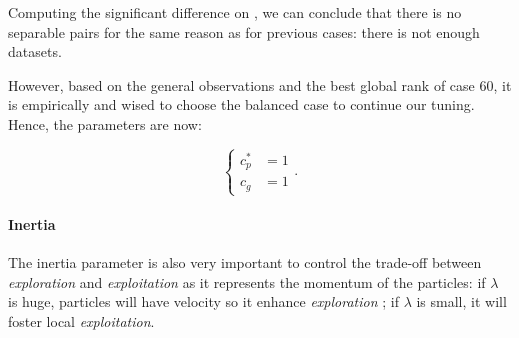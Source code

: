 \documentclass[12pt, openany]{article}
\begin{document}
Computing the significant difference on , we can conclude that there is no separable pairs for the same reason as for previous cases: there is not enough datasets.

\begin{table}[H]
    \centering
    \renewcommand{\arraystretch}{1.3}
    \caption{\textbf{Summary of statistical significance tests for the acceleration coefficients ($c_p$/$c_g$, Cases 58--60).} The Critical Difference (CD) sets the threshold for Nemenyi pairwise significance. No difference is significant in any scope ($p \ge 0.05$).}
    \label{tab:statistical_tests_cp_cg}
\end{table}

However, based on the general observations and the best global rank of case 60, it is empirically and wised to choose the balanced case to continue our tuning. Hence, the parameters are now:

$$
\boxed{
\begin{cases}
    c_p^* &= 1 \\
    c_g &= 1
\end{cases}
}.$$

\paragraph{Inertia} The inertia parameter is also very important to control the trade-off between \emph{exploration} and \emph{exploitation} as it represents the momentum of the particles: if $\lambda$ is huge, particles will have velocity so it enhance \emph{exploration} ; if $\lambda$ is small, it will foster local \emph{exploitation}.
\end{document}
